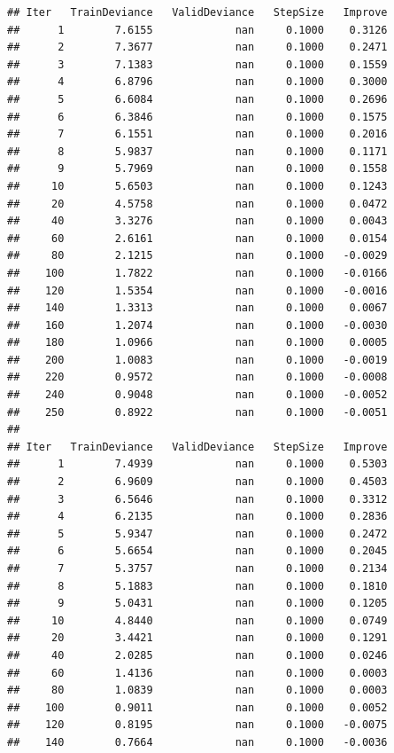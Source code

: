 \documentclass[]{book}
\begin{document}
\begin{verbatim}
## Iter   TrainDeviance   ValidDeviance   StepSize   Improve
##      1        7.6155             nan     0.1000    0.3126
##      2        7.3677             nan     0.1000    0.2471
##      3        7.1383             nan     0.1000    0.1559
##      4        6.8796             nan     0.1000    0.3000
##      5        6.6084             nan     0.1000    0.2696
##      6        6.3846             nan     0.1000    0.1575
##      7        6.1551             nan     0.1000    0.2016
##      8        5.9837             nan     0.1000    0.1171
##      9        5.7969             nan     0.1000    0.1558
##     10        5.6503             nan     0.1000    0.1243
##     20        4.5758             nan     0.1000    0.0472
##     40        3.3276             nan     0.1000    0.0043
##     60        2.6161             nan     0.1000    0.0154
##     80        2.1215             nan     0.1000   -0.0029
##    100        1.7822             nan     0.1000   -0.0166
##    120        1.5354             nan     0.1000   -0.0016
##    140        1.3313             nan     0.1000    0.0067
##    160        1.2074             nan     0.1000   -0.0030
##    180        1.0966             nan     0.1000    0.0005
##    200        1.0083             nan     0.1000   -0.0019
##    220        0.9572             nan     0.1000   -0.0008
##    240        0.9048             nan     0.1000   -0.0052
##    250        0.8922             nan     0.1000   -0.0051
## 
## Iter   TrainDeviance   ValidDeviance   StepSize   Improve
##      1        7.4939             nan     0.1000    0.5303
##      2        6.9609             nan     0.1000    0.4503
##      3        6.5646             nan     0.1000    0.3312
##      4        6.2135             nan     0.1000    0.2836
##      5        5.9347             nan     0.1000    0.2472
##      6        5.6654             nan     0.1000    0.2045
##      7        5.3757             nan     0.1000    0.2134
##      8        5.1883             nan     0.1000    0.1810
##      9        5.0431             nan     0.1000    0.1205
##     10        4.8440             nan     0.1000    0.0749
##     20        3.4421             nan     0.1000    0.1291
##     40        2.0285             nan     0.1000    0.0246
##     60        1.4136             nan     0.1000    0.0003
##     80        1.0839             nan     0.1000    0.0003
##    100        0.9011             nan     0.1000    0.0052
##    120        0.8195             nan     0.1000   -0.0075
##    140        0.7664             nan     0.1000   -0.0036

\end{verbatim}
\end{document}
